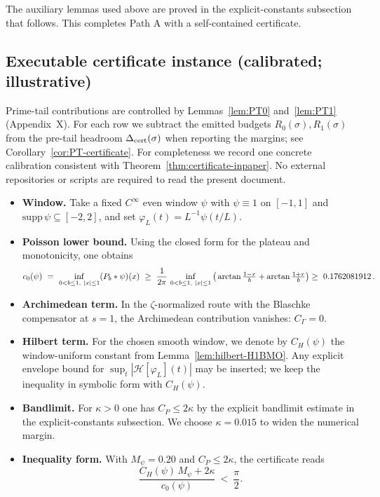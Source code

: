 \documentclass[11pt]{article}
\theoremstyle{definition}
\theoremstyle{remark}
\newcommand{\Poisson}{P}
\begin{document}
The auxiliary lemmas used above are proved in the explicit-constants subsection that follows. This completes Path A with a self-contained certificate.

\subsection*{Executable certificate instance (calibrated; illustrative)}





\noindent Prime-tail contributions are controlled by Lemmas~\ref{lem:PT0} and~\ref{lem:PT1} (Appendix~X). For each row we subtract the emitted budgets $R_{0}(\sigma),R_{1}(\sigma)$ from the pre-tail headroom $\Delta_{\rm cert}(\sigma)$ when reporting the margins; see Corollary~\ref{cor:PT-certificate}.
For completeness we record one concrete calibration consistent with Theorem~\ref{thm:certificate-inpaper}. No external repositories or scripts are required to read the present document.

\begin{itemize}
  \item \textbf{Window.} Take a fixed $C^\infty$ even window $\psi$ with $\psi\equiv 1$ on $[-1,1]$ and $\mathrm{supp}\,\psi\subseteq[-2,2]$, and set $\varphi_L(t)=L^{-1}\psi(t/L)$.
  \item \textbf{Poisson lower bound.} Using the closed form for the plateau and monotonicity, one obtains
  \[
    c_0(\psi)\ =\ \inf_{0<b\le 1,\ |x|\le 1} (\Poisson_b*\psi)(x)\ \ge\ \frac{1}{2\pi}\,\inf_{0<b\le 1,\ |x|\le 1}\big(\arctan\tfrac{1-x}{b}+\arctan\tfrac{1+x}{b}\big)
    \\ \ge\ 0.1762081912\,.
  \]
  \item \textbf{Archimedean term.} In the \(\zeta\)-normalized route with the Blaschke compensator at \(s=1\), the Archimedean contribution vanishes: \(C_\Gamma=0\).
  \item \textbf{Hilbert term.} For the chosen smooth window, we denote by $C_H(\psi)$ the window-uniform constant from Lemma~\ref{lem:hilbert-H1BMO}. Any explicit envelope bound for $\sup_t |\mathcal H[\varphi_L](t)|$ may be inserted; we keep the inequality in symbolic form with $C_H(\psi)$.
  \item \textbf{Bandlimit.} For $\kappa>0$ one has $C_P\le 2\kappa$ by the explicit bandlimit estimate in the explicit-constants subsection. We choose $\kappa=0.015$ to widen the numerical margin.
  \item \textbf{Inequality form.} With $M_\psi=0.20$ and $C_P\le 2\kappa$, the certificate reads
  \[
    \frac{C_H(\psi)\,M_\psi + 2\kappa}{c_0(\psi)}\ <\ \frac{\pi}{2}.
  \]
\end{itemize}
\end{document}

